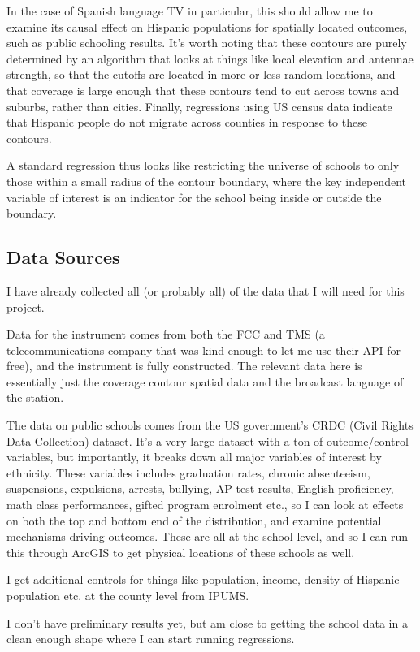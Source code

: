 \documentclass{article}
\begin{document}
In the case of Spanish language TV in particular, this should allow me to examine its causal effect on Hispanic populations for spatially located outcomes, such as public schooling results. It's worth noting that these contours are purely determined by an algorithm that looks at things like local elevation and antennae strength, so that the cutoffs are located in more or less random locations, and that coverage is large enough that these contours tend to cut across towns and suburbs, rather than cities. Finally, regressions using US census data indicate that Hispanic people do not migrate across counties in response to these contours.

A standard regression thus looks like restricting the universe of schools to only those within a small radius of the contour boundary, where the key independent variable of interest is an indicator for the school being inside or outside the boundary.

\subsection*{Data Sources}

I have already collected all (or probably all) of the data that I will need for this project.

Data for the instrument comes from both the FCC and TMS (a telecommunications company that was kind enough to let me use their API for free), and the instrument is fully constructed. The relevant data here is essentially just the coverage contour spatial data and the broadcast language of the station.

The data on public schools comes from the US government's CRDC (Civil Rights Data Collection) dataset. It's a very large dataset with a ton of outcome/control variables, but importantly, it breaks down all major variables of interest by ethnicity. These variables includes graduation rates, chronic absenteeism, suspensions, expulsions, arrests, bullying, AP test results, English proficiency, math class performances, gifted program enrolment etc., so I can look at effects on both the top and bottom end of the distribution, and examine potential mechanisms driving outcomes. These are all at the school level, and so I can run this through ArcGIS to get physical locations of these schools as well.

I get additional controls for things like population, income, density of Hispanic population etc. at the county level from IPUMS.

I don't have preliminary results yet, but am close to getting the school data in a clean enough shape where I can start running regressions.




%
\end{document}
